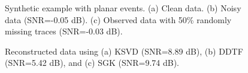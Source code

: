 \begin{figure}[htb!]
\centering
{}
\caption{Synthetic example with planar events. (a) Clean data. (b) Noisy data (SNR=-0.05 dB). (c) Observed data with 50\% randomly missing traces (SNR=-0.03 dB).}
\label{fig:synth-clean,synth-noisy,synth-obs}
\end{figure}


\begin{figure}[htb!]
\centering
{}
\caption{Reconstructed data using (a) KSVD (SNR=8.89 dB), (b) DDTF (SNR=5.42 dB), and (c) SGK (SNR=9.74 dB).}
\label{fig:synth-ksvd,synth-ddtf,synth-sgk}
\end{figure}

